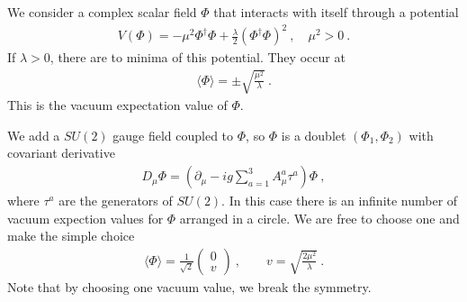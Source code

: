 We consider a complex scalar field $\Phi$ that interacts with itself through a potential
\begin{align}
	V(\Phi) = -\mu^2\Phi^\dagger\Phi + \frac{\lambda}{2}(\Phi^\dagger\Phi)^2 \ , \quad \mu^2 > 0 \ .
\end{align}
If $\lambda>0$, there are to minima of this potential. They occur at
\begin{align}
	\langle\Phi\rangle =  \pm\sqrt{\frac{\mu^2}{\lambda}} \ .
\end{align}
This is the vacuum expectation value of $\Phi$.

We add a $SU(2)$ gauge field coupled to $\Phi$, so $\Phi$ is a doublet $(\Phi_1,\Phi_2)$ with covariant derivative
\begin{align}
	D_\mu\Phi = (\partial_\mu - ig\sum_{a=1}^3A_\mu^a\tau^a)\Phi \ ,
\end{align}
where $\tau^a$ are the generators of $SU(2)$. In this case there is an infinite number of vacuum expection values for $\Phi$ arranged in a circle. We are free to choose one and make the simple choice
\begin{align}\label{eq:vev}
	\langle\Phi\rangle = \frac{1}{\sqrt{2}}\begin{pmatrix} 0 \\ v \end{pmatrix} \ , \qquad v = \sqrt{\frac{2\mu^2}{\lambda}} \ .
\end{align}
Note that by choosing one vacuum value, we break the symmetry.


